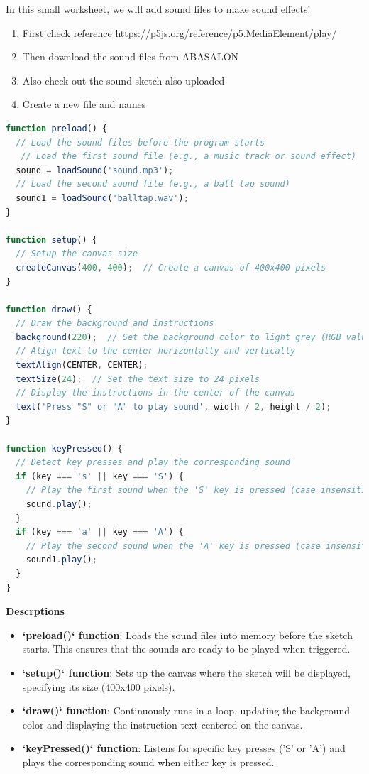 \begin{exercisebox}[adjusted title= Introduction to Sounds]
In this small worksheet, we will add sound files to make sound effects!

\begin{enumerate}
\item First check reference https://p5js.org/reference/p5.MediaElement/play/
\item Then download the sound files from ABASALON 
\item Also check out the sound sketch also uploaded
\item Create a new file and names  

\end{enumerate}


\begin{lstlisting}[language=JavaScript]
function preload() {
  // Load the sound files before the program starts
   // Load the first sound file (e.g., a music track or sound effect)
  sound = loadSound('sound.mp3'); 
  // Load the second sound file (e.g., a ball tap sound)
  sound1 = loadSound('balltap.wav');  
}

function setup() {
  // Setup the canvas size
  createCanvas(400, 400);  // Create a canvas of 400x400 pixels
}

function draw() {
  // Draw the background and instructions
  background(220);  // Set the background color to light grey (RGB value: 220)
  // Align text to the center horizontally and vertically
  textAlign(CENTER, CENTER);  
  textSize(24);  // Set the text size to 24 pixels
  // Display the instructions in the center of the canvas
  text('Press "S" or "A" to play sound', width / 2, height / 2);  
}

function keyPressed() {
  // Detect key presses and play the corresponding sound
  if (key === 's' || key === 'S') {
    // Play the first sound when the 'S' key is pressed (case insensitive)
    sound.play();
  }
  if (key === 'a' || key === 'A') {
    // Play the second sound when the 'A' key is pressed (case insensitive)
    sound1.play();
  }
}
\end{lstlisting}

\textbf{Descrptions}

\begin{itemize}
    \item \textbf{`preload()` function}: Loads the sound files into memory before the sketch starts. This ensures that the sounds are ready to be played when triggered.
    \item \textbf{`setup()` function}: Sets up the canvas where the sketch will be displayed, specifying its size (400x400 pixels).
    \item \textbf{`draw()` function}: Continuously runs in a loop, updating the background color and displaying the instruction text centered on the canvas.
    \item \textbf{`keyPressed()` function}: Listens for specific key presses ('S' or 'A') and plays the corresponding sound when either key is pressed.
\end{itemize}

\end{exercisebox}

